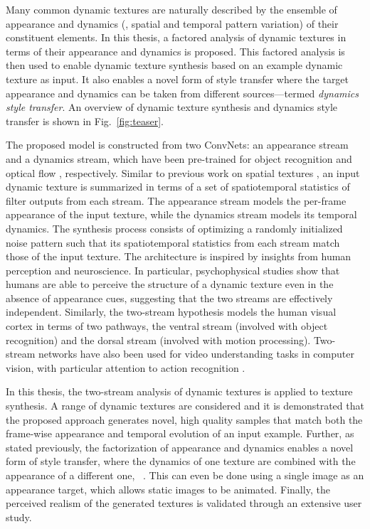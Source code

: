 Many common dynamic textures are naturally described by the ensemble of 
appearance and dynamics (\ie, spatial and temporal pattern variation) of their 
constituent elements. In this thesis, a factored analysis of dynamic 
textures in terms of their appearance and dynamics is proposed.
This factored analysis is then used to enable dynamic texture synthesis
based on an example dynamic texture as input.
It also enables a novel form of style transfer where the 
target appearance and dynamics can be taken from different sources---termed \emph{dynamics style transfer}.
An overview of dynamic texture synthesis and dynamics style transfer
is shown in Fig.\ \ref{fig:teaser}.
\clearpage

\clearpage
The proposed model is constructed from two ConvNets: an appearance stream and a dynamics stream,
which have been pre-trained for object recognition
and optical flow , respectively.
Similar to previous work on spatial textures
\cite{gatys2015,heeger1995pyramid,portilla2000parametric}, an input dynamic texture is summarized in terms of a set of
spatiotemporal statistics of filter outputs from each stream.
The appearance stream models the per-frame appearance of
the input texture, while the dynamics stream models its
temporal dynamics.
The synthesis process consists of optimizing a randomly initialized noise pattern such that its spatiotemporal statistics from
each stream match those of the input texture.
The architecture is inspired by insights from human perception and 
neuroscience.
In particular, psychophysical studies \cite{cutting1982} show that
humans are able to perceive the structure of a dynamic texture even
in the absence of appearance cues, suggesting that the two streams
are effectively independent.
Similarly, the two-stream hypothesis \cite{goodale1992} models the 
human visual cortex in terms of two pathways, the ventral stream
(involved with object recognition) and the
dorsal stream (involved with motion processing). Two-stream networks have also been used for video understanding tasks in computer vision, with particular attention to action recognition \cite{simonyan2014,feichtenhofer2016two}.

In this thesis, the two-stream analysis of
dynamic textures is applied to texture synthesis.
A range of dynamic textures are considered and it is demonstrated that the 
proposed approach generates novel, high quality samples that match
both the frame-wise appearance and temporal evolution of an input
example.
Further, as stated previously, the factorization of appearance and dynamics enables a 
novel form of style transfer, where the dynamics of one texture are 
combined with the appearance of a different one,
\cf\ \cite{gatys2016image}.
This can even be done using a single image as an appearance
target, which allows static images to be animated.
Finally, the perceived realism of the generated textures is validated
through an extensive user study.

